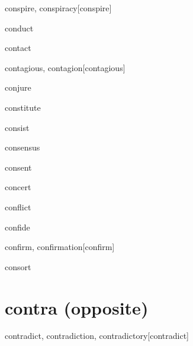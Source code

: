 \begin{RefWord}{conspire, conspiracy}[conspire]
\end{RefWord}

\begin{RefWord}{conduct}
\end{RefWord}

\begin{RefWord}{contact}
\end{RefWord}

\begin{RefWord}{contagious, contagion}[contagious]
\end{RefWord}

\begin{RefWord}{conjure}
\end{RefWord}

\begin{RefWord}{constitute}
\end{RefWord}

\begin{RefWord}{consist}
\end{RefWord}

\begin{RefWord}{consensus}
\end{RefWord}

\begin{RefWord}{consent}
\end{RefWord}

\begin{RefWord}{concert}
\end{RefWord}

\begin{RefWord}{conflict}
\end{RefWord}

\begin{RefWord}{confide}
\end{RefWord}

\begin{RefWord}{confirm, confirmation}[confirm]
\end{RefWord}

\begin{RefWord}{consort}
\end{RefWord}

\section{contra (opposite)}

\begin{RefWord}{contradict, contradiction, contradictory}[contradict]
\end{RefWord}

